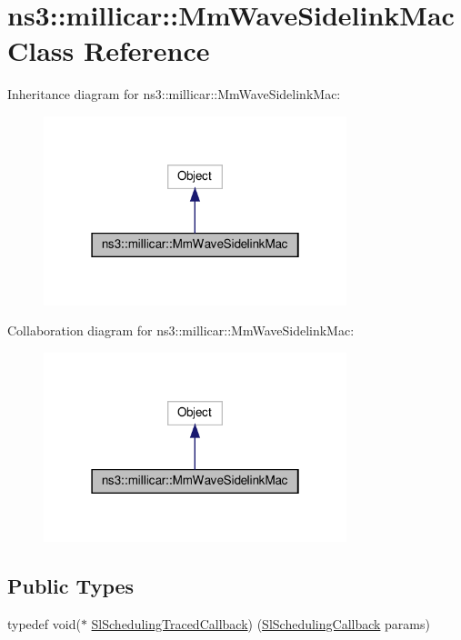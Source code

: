 \hypertarget{classns3_1_1millicar_1_1MmWaveSidelinkMac}{}\section{ns3\+:\+:millicar\+:\+:Mm\+Wave\+Sidelink\+Mac Class Reference}
\label{classns3_1_1millicar_1_1MmWaveSidelinkMac}


Inheritance diagram for ns3\+:\+:millicar\+:\+:Mm\+Wave\+Sidelink\+Mac\+:
\nopagebreak
\begin{figure}[H]
\begin{center}
\leavevmode
\includegraphics[width=250pt]{classns3_1_1millicar_1_1MmWaveSidelinkMac__inherit__graph}
\end{center}
\end{figure}


Collaboration diagram for ns3\+:\+:millicar\+:\+:Mm\+Wave\+Sidelink\+Mac\+:
\nopagebreak
\begin{figure}[H]
\begin{center}
\leavevmode
\includegraphics[width=250pt]{classns3_1_1millicar_1_1MmWaveSidelinkMac__coll__graph}
\end{center}
\end{figure}
\subsection*{Public Types}
\begin{DoxyCompactItemize}
\item 
typedef void($\ast$ \hyperlink{classns3_1_1millicar_1_1MmWaveSidelinkMac_ad5c7416a57edcebe1e57106b503831c7}{Sl\+Scheduling\+Traced\+Callback}) (\hyperlink{structns3_1_1millicar_1_1SlSchedulingCallback}{Sl\+Scheduling\+Callback} params)
\end{DoxyCompactItemize}
